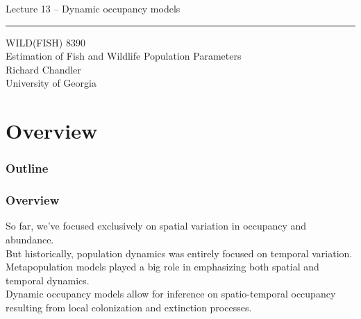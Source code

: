 \documentclass[color=usenames,dvipsnames]{beamer}\usepackage[]{graphicx}\usepackage[]{color}
\begin{document}
\begin{frame}[plain]
  \LARGE
  \centering
  {\huge Lecture 13 -- Dynamic occupancy models} \\
  {\color{default} \rule{\textwidth}{0.1pt}}
  \vfill
  \large
  WILD(FISH) 8390 \\
  Estimation of Fish and Wildlife Population Parameters \\
  \vfill
  \large
  Richard Chandler \\
  University of Georgia \\
\end{frame}






\section{Overview}



\begin{frame}[plain]
  \frametitle{Outline}
  \Large
\end{frame}



\begin{frame}
  \frametitle{Overview}
  So far, we've focused exclusively on spatial variation in occupancy
  and abundance. \\  
  \pause
  \vfill
  But historically, population dynamics was entirely focused on
  temporal variation. \\
  \pause
  \vfill
  Metapopulation models played a big role in emphasizing both spatial
  and temporal dynamics. \\
  \pause
  \vfill
  Dynamic occupancy models allow for inference on spatio-temporal
  occupancy resulting from local colonization and extinction
  processes. \\
\end{frame}
\end{document}
